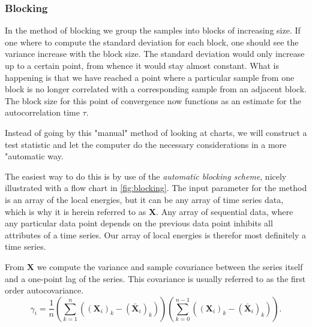\documentclass[
    a4paper, aps, twocolumn, floatfix, superscriptaddress, nofootinbib]{revtex4-1}
\newcommand{\1}{\mathds{1}}
\begin{document}
        \subsubsection{Blocking}
        In the method of blocking we group the samples into blocks of increasing size. If one where to compute
        the standard deviation for each block, one should see the variance increase with the block size.
        The standard deviation would only increase up to a certain point, from whence it would stay
        almost constant. What is happening is that we have reached a point where a particular
        sample from one block is no longer correlated with a corresponding sample from an adjacent block.
        The block size for this point of convergence now functions as an estimate for the autocorrelation
        time $\tau$.

         Instead of going by this "manual" method of looking at charts, we will construct a test statistic and
         let the computer do the necessary considerations in a more "automatic way.

        The easiest way to do this is by use of the \emph{automatic blocking scheme}, nicely illustrated
        with a flow chart in \autoref{fig:blocking}. The input parameter for the method is an array of the
        local energies, but it can be any array of time series data, which is why it is herein referred to as
        $\mathbf{X}$. Any array of sequential data, where any particular data point depends on the previous
        data point inhibits all attributes of a time series. Our array of local energies is therefor most definitely
        a time series.

        From $\mathbf{X}$ we compute the variance and sample covariance between the series itself and a
        one-point lag of the series. This covariance is usually referred to as the first order autocovariance.
        \begin{equation}
            \gamma_i = \frac{1}{n}
                \left(\sum_{k=1}^n\left((\mathbf{X}_i)_k - (\bar{\mathbf{X}}_i)_k\right)\right)
                \left(\sum_{k=0}^{n-1}\left((\mathbf{X}_i)_k - (\bar{\mathbf{X}}_i)_k\right)\right).
        \end{equation}
\end{document}
